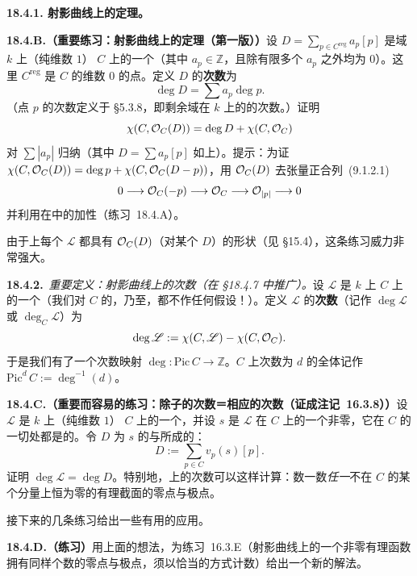 \textbf{18.4.1. 射影曲线上\trLineBundle{}的\trRiemannRoch{}定理。}

\textbf{18.4.B.（重要练习：射影曲线上\trLineBundle{}的\trRiemannRoch{}定理（第一版））}\quad 设 $D=\sum_{p\in C^{\mathrm{reg}}}a_p[p]$ 是域 $k$ 上\trProjective{}（纯维数 $1$）\trCurve{} $C$ 上的一个\trDivisor（其中 $a_p\in\mathbb{Z}$，且除有限多个 $a_p$ 之外均为 $0$）。这里 $C^{\mathrm{reg}}$ 是 $C$ 的维数 $0$ 的\trRegular{}点。定义 $D$ 的\textbf{次数}为
\[
\deg D=\sum a_p\deg p.
\]
（点 $p$ 的次数定义于 \S5.3.8，即剩余域在 $k$ 上的\trFieldExtension{}的次数。）证明
\[
\chi(C,\mathcal{O}_C(D))=\deg D+\chi(C,\mathcal{O}_C)
\]
对 $\sum|a_p|$ 归纳（其中 $D=\sum a_p[p]$ 如上）。提示：为证 $\chi(C,\mathcal{O}_C(D))=\deg p+\chi(C,\mathcal{O}_C(D-p))$，用 $\mathcal{O}_C(D)$ 去张量\trClosedSubscheme{}正合列~\mbox{(9.1.2.1)}
\[
0\longrightarrow\mathcal{O}_C(-p)\longrightarrow\mathcal{O}_C\longrightarrow\mathcal{O}_{|p|}\longrightarrow 0
\]
并利用\trEulerCharacteristic{}在\trExactSequence{}中的加性（\mbox{练习~18.4.A}）。

由于\trRegular{}\trCurve{}上每个\trInvertibleSheaf{} $\mathscr{L}$ 都具有 $\mathcal{O}_C(D)$（对某个 $D$）的形状（见 \S15.4），这条练习威力非常强大。

\textbf{18.4.2.}\ \emph{重要定义：射影曲线上\trLineBundle{}的次数（在 \S18.4.7 中推广）。}\quad 设 $\mathscr{L}$ 是 $k$ 上\trProjective{}\trCurve{} $C$ 上的一个\trInvertibleSheaf（我们对 $C$ 的\trRegularity，乃至\trReducedness，都不作任何假设！）。定义 $\mathscr{L}$ 的\textbf{次数}（记作 $\deg\mathscr{L}$ 或 $\deg_C\mathscr{L}$）为
\[
\deg\mathscr{L}:=\chi(C,\mathscr{L})-\chi(C,\mathcal{O}_C).
\]
于是我们有了一个次数映射 $\deg\colon\mathrm{Pic}\,C\to\mathbb{Z}$。$C$ 上次数为 $d$ 的\trLineBundle{}全体记作 $\mathrm{Pic}^d\,C:=\deg^{-1}(d)$。

\textbf{18.4.C.（重要而容易的练习：除子的次数＝相应\trLineBundle{}的次数（证成\mbox{注记~16.3.8}））}\quad 设 $\mathscr{L}$ 是 $k$ 上\trProjective{}（纯维数 $1$）\trCurve{} $C$ 上的一个\trInvertibleSheaf，并设 $s$ 是 $\mathscr{L}$ 在 $C$ 上的一个非零\trRational{}\trSection，它在 $C$ 的一切\trSingularPoint{}处都是\trRegular{}的。令 $D$ 为 $s$ 的\trZeros{}与\trPole{}所成的\trDivisor：
\[
D:=\sum_{p\in C}v_p(s)[p].
\]
证明 $\deg\mathscr{L}=\deg D$。特别地，\trRegular{}\trCurve{}上\trLineBundle{}的次数可以这样计算：数一数\emph{任一}不在 $C$ 的某个分量上恒为零的有理截面的零点与极点。

接下来的几条练习给出一些有用的应用。

\textbf{18.4.D.（练习）}\quad 用上面的想法，为\mbox{练习~16.3.E}（射影曲线上的一个非零有理函数拥有同样个数的零点与极点，须以恰当的方式计数）给出一个新的解法。

